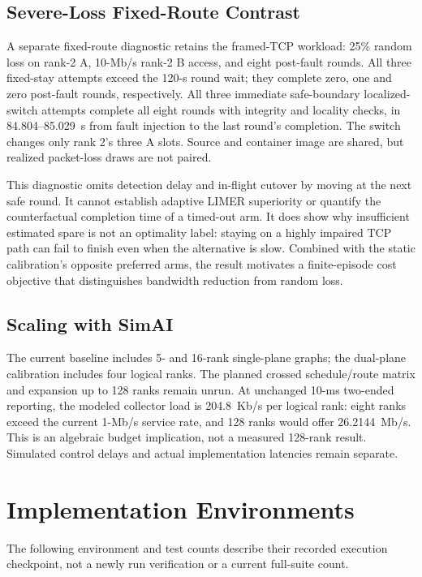 \documentclass[sigconf]{acmart}
\begin{document}
\subsection{Severe-Loss Fixed-Route Contrast}
A separate fixed-route diagnostic retains the framed-TCP workload:
25\% random loss on rank-2 A, 10-Mb/s rank-2 B access, and eight
post-fault rounds. All three fixed-stay attempts exceed the 120-s
round wait; they complete zero, one and zero post-fault rounds,
respectively. All three immediate safe-boundary localized-switch
attempts complete all eight rounds with integrity and locality checks,
in 84.804--85.029~s from fault injection to the last round's completion.
The switch changes only rank 2's three A slots. Source and container
image are shared, but realized packet-loss draws are not paired.

This diagnostic omits detection delay and in-flight cutover by moving
at the next safe round. It cannot establish adaptive LIMER superiority
or quantify the counterfactual completion time of a timed-out arm.
It does show why insufficient estimated spare is not an optimality
label: staying on a highly impaired TCP path can fail to finish even
when the alternative is slow. Combined with the static calibration's
opposite preferred arms, the result motivates a finite-episode cost
objective that distinguishes bandwidth reduction from random loss.

\subsection{Scaling with SimAI}
The current baseline includes 5- and 16-rank single-plane graphs; the
dual-plane calibration includes four logical ranks. The planned crossed
schedule/route matrix and expansion up to 128 ranks remain unrun.
At unchanged 10-ms two-ended reporting, the modeled collector load is
204.8~Kb/s per logical rank: eight ranks exceed the current 1-Mb/s
service rate, and 128 ranks would offer 26.2144~Mb/s. This is an
algebraic budget implication, not a measured 128-rank result. Simulated
control delays and actual implementation latencies remain separate.

\section{Implementation Environments}
\label{app:implementation}
The following environment and test counts describe their recorded execution
checkpoint, not a newly run verification or a current full-suite count.
\end{document}

